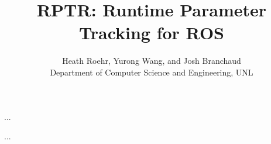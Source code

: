 \documentclass[acmtocl,acmnow]{acmtrans2m}
\title{RPTR: Runtime Parameter Tracking for ROS}
\author{Heath Roehr, Yurong Wang, and Josh Branchaud\\
Department of Computer Science and Engineering, UNL}
\begin{document}
            
\begin{bottomstuff} 

\end{bottomstuff}
            
\maketitle







\begin{thebibliography}{...}
...
\end{thebibliography}

\begin{received}
...
\end{received}
\end{document}
